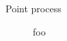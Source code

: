\documentclass[aspectratio=169]{beamer}
\begin{document}
\begin{frame}{Point process}
  \begin{figure}
  \centering
  
  \caption{foo}
  \end{figure}
\end{frame}
\end{document}
